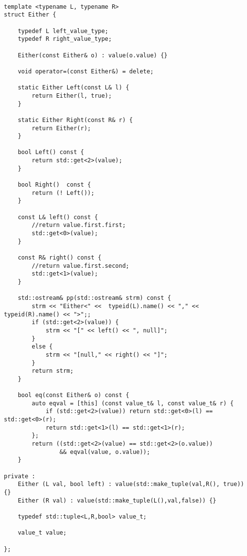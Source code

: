 \documentclass[12pt,fleqn]{article}
\begin{document}
%
%
\begin{minipage}{\linewidth}
\begin{lstlisting}[caption=Either type class,label=either]

template <typename L, typename R>
struct Either {

	typedef L left_value_type;
	typedef R right_value_type;

	Either(const Either& o) : value(o.value) {}

	void operator=(const Either&) = delete;

	static Either Left(const L& l) {
		return Either(l, true);
	}

	static Either Right(const R& r) {
		return Either(r);
	}

	bool Left() const {
		return std::get<2>(value);
	}

	bool Right()  const {
		return (! Left());
	}

	const L& left() const {
		//return value.first.first;
		std::get<0>(value);
	}

	const R& right() const {
		//return value.first.second;
		std::get<1>(value);
	}

 	std::ostream& pp(std::ostream& strm) const {
		strm << "Either<" <<  typeid(L).name() << "," << typeid(R).name() << ">";;
		if (std::get<2>(value)) {
			strm << "[" << left() << ", null]";
		}
		else {
			strm << "[null," << right() << "]"; 
		}
		return strm;
	}

	bool eq(const Either& o) const {
		auto eqval = [this] (const value_t& l, const value_t& r) {
			if (std::get<2>(value)) return std::get<0>(l) == std::get<0>(r);
			return std::get<1>(l) == std::get<1>(r);
		};
		return ((std::get<2>(value) == std::get<2>(o.value))
				&& eqval(value, o.value));
	}

private :
	Either (L val, bool left) : value(std::make_tuple(val,R(), true)) {}
	Either (R val) : value(std::make_tuple(L(),val,false)) {}

	typedef std::tuple<L,R,bool> value_t;

	value_t value;
	
};

\end{lstlisting}
\end{minipage}
%
%
%
\end{document}
